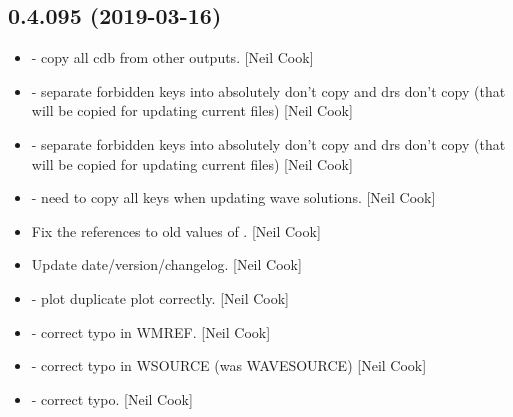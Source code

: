 \documentclass[a4paper,10pt,english]{report}
\begin{document}
\subsection{0.4.095 (2019-03-16)}
\label{\detokenize{misc/changelog:id165}}\begin{itemize}
\item {} 
 - copy all cdb from other outputs. {[}Neil Cook{]}

\item {} 
 - separate forbidden keys into absolutely don’t copy and
drs don’t copy (that will be copied for updating current files) {[}Neil
Cook{]}

\item {} 
 - separate forbidden keys into absolutely don’t copy and
drs don’t copy (that will be copied for updating current files) {[}Neil
Cook{]}

\item {} 
 - need to copy all keys when updating wave solutions.
{[}Neil Cook{]}

\item {} 
Fix the references to old values of . {[}Neil Cook{]}

\item {} 
Update date/version/changelog. {[}Neil Cook{]}

\item {} 
 - plot duplicate plot correctly. {[}Neil Cook{]}

\item {} 
 - correct typo in WMREF. {[}Neil Cook{]}

\item {} 
 - correct typo in WSOURCE (was WAVESOURCE)
{[}Neil Cook{]}

\item {} 
 - correct typo. {[}Neil Cook{]}

\end{itemize}
\end{document}
